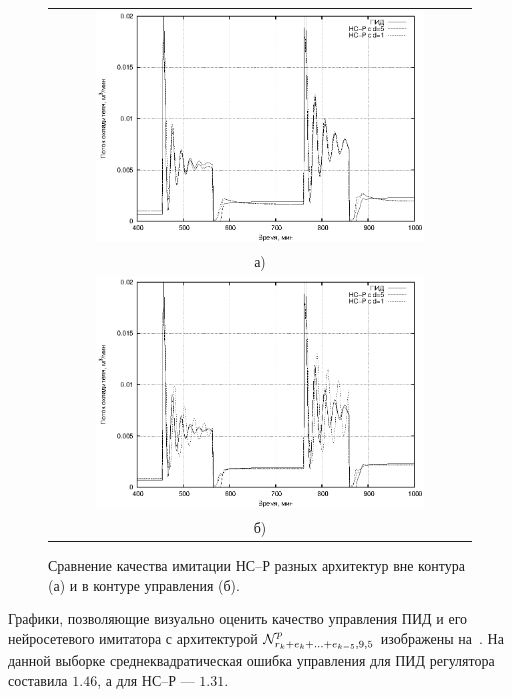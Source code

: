 \begin{figure}
  \centering
  \begin{tabular}{c}
    \includegraphics[width=0.8\textwidth,%
      totalheight=0.35\textheight]{cstr_e5r1_vs_e1r1_outloop_rus} \\
    а) \\
    \includegraphics[width=0.8\textwidth,%
      totalheight=0.35\textheight]{cstr_e5r1_vs_e1r1_inloop_rus} \\
    б)
  \end{tabular}
  \caption{Сравнение качества имитации НС--Р разных архитектур вне контура (а) и в контуре управления (б).}%
  \label{fig:cstr_e5r1_vs_e1r1_training}
\end{figure}

Графики, позволяющие визуально оценить качество управления ПИД и его
нейросетевого имитатора с архитектурой
$\mathcal{N}^p_{r_k+e_k+\ldots+e_{k-5},9,5}$ изображены
на~.  На данной выборке
среднеквадратическая ошибка управления для ПИД регулятора составила
$1.46$, а для НС--Р --- $1.31$.

